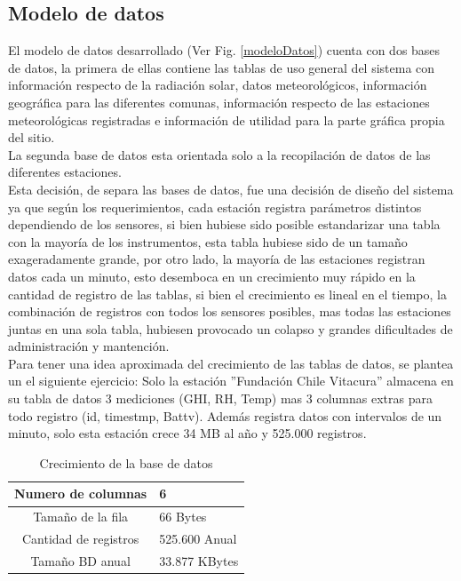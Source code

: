 \subsection{Modelo de datos}
El modelo de datos desarrollado (Ver Fig. \ref{modeloDatos}) cuenta con dos bases de datos, la primera de ellas contiene las tablas de uso general del sistema con información respecto de la radiación solar, datos meteorológicos, información geográfica para las diferentes comunas, información respecto de las estaciones meteorológicas registradas e información de utilidad para la parte gráfica propia del sitio.\\ La segunda base de datos esta orientada solo a la recopilación de datos de las diferentes estaciones.\\ Esta decisión, de separa las bases de datos, fue una decisión de diseño del sistema ya que según los requerimientos, cada estación registra parámetros distintos dependiendo de los sensores, si bien hubiese sido posible estandarizar una tabla con la mayoría de los instrumentos, esta tabla hubiese sido de un tamaño exageradamente grande, por otro lado, la mayoría de las estaciones registran datos cada un minuto, esto desemboca en un crecimiento muy rápido en la cantidad de registro de las tablas, si bien el crecimiento es lineal en el tiempo, la combinación de registros con todos los sensores posibles, mas todas las estaciones juntas en una sola tabla, hubiesen provocado un colapso y grandes dificultades de administración y mantención.\\

Para tener una idea aproximada del crecimiento de las tablas de datos, se plantea un el siguiente ejercicio: Solo la estación ''Fundación Chile Vitacura'' almacena en su tabla de datos 3 mediciones (GHI, RH, Temp) mas 3 columnas extras para todo registro (id, timestmp, Battv). Además registra datos con intervalos de un minuto, solo esta estación crece 34 MB al año y 525.000 registros.

\begin{table}[h!]
\caption{Crecimiento de la base de datos}
\begin{tabular}{| c | p{11cm} |}
        \hline
        Numero de columnas & 6\\
        \hline
	Tamaño de la fila & 66 Bytes\\
	\hline
	Cantidad de registros & 525.600 Anual\\
	\hline
	Tamaño BD anual & 33.877 KBytes\\
	\hline
\end{tabular}
\end{table}

